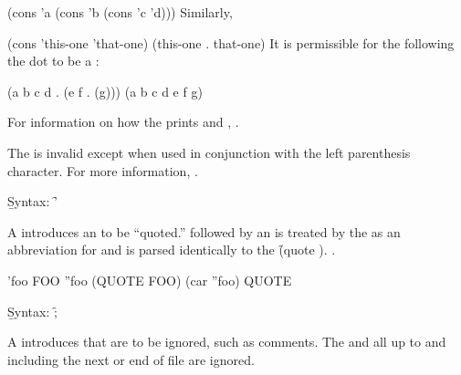 \code
 (cons 'a (cons 'b (cons 'c 'd)))
\endcode
Similarly,

\code
 (cons 'this-one 'that-one) \EV (this-one . that-one)
\endcode
It is permissible for the  
following the dot to be a :

\code
 (a b c d . (e f . (g))) \EQ (a b c d e f g)
\endcode

For information on how the  prints  and ,
\seesection\PrintingListsAndConses.

\endsubsection%

\idxcode{)}


The  is invalid 
except when used in conjunction with the left parenthesis character.
For more information, \seesection\ReaderAlgorithm.

\endsubsection%


\b{Syntax:}  \f{'}


A  introduces an  to be ``quoted.''
 followed by an   
is treated by the  as an abbreviation for
and is parsed identically to the  \f{(quote )}.
.


\code
 'foo \EV FOO
 ''foo \EV (QUOTE FOO)
 (car ''foo) \EV QUOTE
\endcode

\endsubsubsection%

\endsubsection%

\idxcode{;}

\b{Syntax:} \f{;}


A  introduces  that are to be ignored,
such as comments.  The  and all  up to
and including the next  or end of file are ignored.

